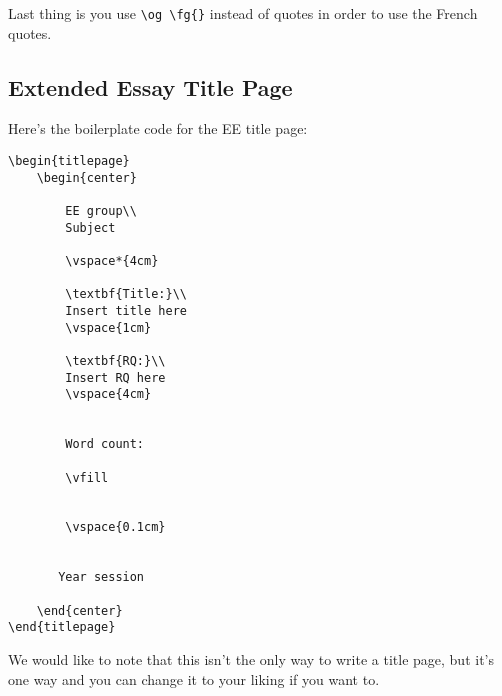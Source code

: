 Last thing is you use \verb|\og \fg{}| instead of quotes in order to use the French quotes.
\subsection{Extended Essay Title Page}
Here's the boilerplate code for the EE title page:
\begin{verbatim}
\begin{titlepage}
    \begin{center}
        
        EE group\\
        Subject
        
        \vspace*{4cm}
 
        \textbf{Title:}\\
        Insert title here
        \vspace{1cm}

        \textbf{RQ:}\\
        Insert RQ here
        \vspace{4cm}


        Word count:
 
        \vfill
 
 
        \vspace{0.1cm}
 
 
       Year session
 
    \end{center}
\end{titlepage}
\end{verbatim}
We would like to note that this isn't the only way to write a title page,
but it's one way and you can change it to your liking if you want to.